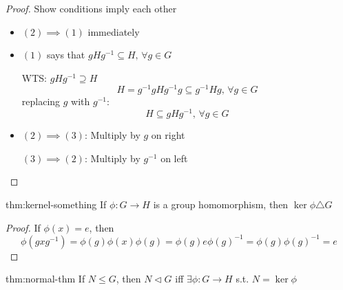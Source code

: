 \documentclass{article}
\begin{document}
\begin{proof}
    Show conditions imply each other
    \begin{itemize}
        \item $(2) \implies (1)$ immediately
        \item $(1)$ says that $gHg^{-1} \subseteq H,\,\forall g\in G$

            WTS: $gHg^{-1} \supseteq H$
            \[H = g^{-1}gHg^{-1}g \subseteq g^{-1}Hg,\,\forall g\in G\]
            replacing $g$ with $g^{-1}$:
            \[H \subseteq gHg^{-1},\,\forall g\in G\]
        \item $(2) \implies (3)$: Multiply by $g$ on right

            $(3) \implies (2)$: Multiply by $g^{-1}$ on left
    \end{itemize}
\end{proof}

\begin{thm}[lma]{thm:kernel-something}{}
    If $\phi : G \to H$ is a group homomorphism, then $\ker \phi \triangle G$
\end{thm}

\begin{proof}
    If $\phi(x) = e$, then
    \[\phi(gxg^{-1}) = \phi(g)\phi(x)\phi(g) = \phi(g) e \phi(g)^{-1} = \phi(g)\phi(g)^{-1} = e\]
\end{proof}

\begin{thm}[]{thm:normal-thm}{}
    If $N \le G$, then $N \triangleleft G$ iff $\exists \phi : G \to H$ s.t. $N = \ker \phi$
\end{thm}
\end{document}
